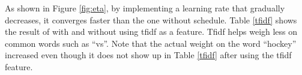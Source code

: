 \documentclass[11pt]{article}
\begin{document}

As shown in Figure \ref{fig:eta}, by implementing a learning rate that gradually decreases, it converges faster than the one without schedule. Table \ref{tfidf} shows the result of with and without using tfidf as a feature. Tfidf helps weigh less on common words such as ``vs''. Note that the actual weight on the word ``hockey'' increased even though it does not show up in Table \ref{tfidf} after using the tfidf feature.
\end{document}
